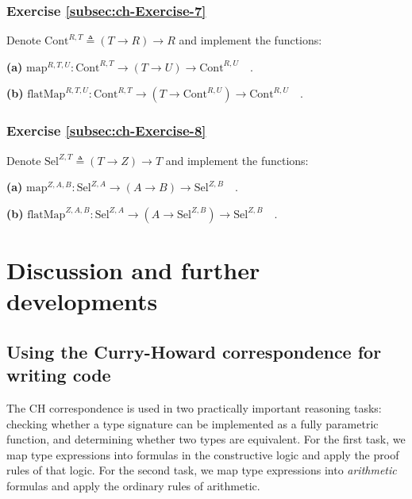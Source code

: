 \subsubsection{Exercise \label{subsec:ch-Exercise-7}\ref{subsec:ch-Exercise-7}}

Denote $\text{Cont}^{R,T}\triangleq\left(T\rightarrow R\right)\rightarrow R$
and implement the functions:

\textbf{(a)} $\text{map}^{R,T,U}:\text{Cont}^{R,T}\rightarrow(T\rightarrow U)\rightarrow\text{Cont}^{R,U}\quad.$

\textbf{(b)} $\text{flatMap}^{R,T,U}:\text{Cont}^{R,T}\rightarrow(T\rightarrow\text{Cont}^{R,U})\rightarrow\text{Cont}^{R,U}\quad.$

\subsubsection{Exercise \label{subsec:ch-Exercise-8}\ref{subsec:ch-Exercise-8}}

Denote $\text{Sel}^{Z,T}\triangleq\left(T\rightarrow Z\right)\rightarrow T$
and implement the functions:

\textbf{(a)} $\text{map}^{Z,A,B}:\text{Sel}^{Z,A}\rightarrow\left(A\rightarrow B\right)\rightarrow\text{Sel}^{Z,B}\quad.$

\textbf{(b)} $\text{flatMap}^{Z,A,B}:\text{Sel}^{Z,A}\rightarrow(A\rightarrow\text{Sel}^{Z,B})\rightarrow\text{Sel}^{Z,B}\quad.$

\section{Discussion and further developments}

\subsection{Using the Curry-Howard correspondence for writing code}

The CH correspondence is used in two practically important reasoning
tasks: checking whether a type signature can be implemented as a fully
parametric function, and determining whether two types are equivalent.
For the first task, we map type expressions into formulas in the constructive
logic and apply the proof rules of that logic. For the second task,
we map type expressions into \emph{arithmetic} formulas and apply
the ordinary rules of arithmetic.

